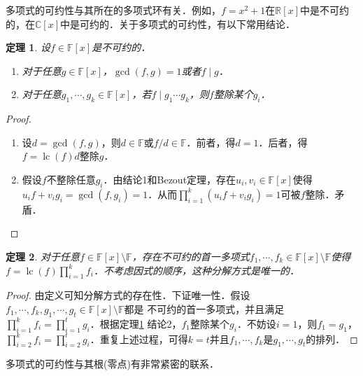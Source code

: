 \documentclass[a4paper,fontset=windows]{ctexbook}
\newtheorem{theorem}{定理}[chapter]
\theoremstyle{definition}
\DeclareMathOperator{\lc}{lc}
\begin{document}
多项式的可约性与其所在的多项式环有关．例如，$f=x^2+1$在$\mathbb{R}[x]$中是不可约的，在$\mathbb{C}[x]$中是可约的．关于多项式的可约性，有以下常用结论．

\begin{theorem}\label{thm11.10}
设$f\in\mathbb{F}[x]$是不可约的．
\begin{enumerate}
\item 对于任意$g\in\mathbb{F}[x]$，$\gcd(f,g)=1$或者$f\mid g$．

\item 对于任意$g_1,\cdots,g_k\in\mathbb{F}[x]$，若$f\mid g_1\cdots g_k$，则$f$整除某个$g_i$．
\end{enumerate}
\end{theorem}

\begin{proof}~
\begin{enumerate}
\item 设$d=\gcd(f,g)$，则$d\in\mathbb{F}$或$f/d\in\mathbb{F}$．前者，得$d=1$．后者，得$f=\lc(f)d$整除$g$．

\item 假设$f$不整除任意$g_i$．由结论1和Bezout定理，存在$u_i,v_i\in\mathbb{F}[x]$使得$u_if+v_ig_i=\gcd(f,g_i)=1$．从而$\prod\limits_{i=1}^k(u_if+v_ig_i)=1$可被$f$整除．矛盾．\qedhere
\end{enumerate}
\end{proof}

\begin{theorem}
对于任意$f\in\mathbb{F}[x]\setminus\mathbb{F}$，存在不可约的首一多项式$f_1,\cdots,f_k\in\mathbb{F}[x]\setminus\mathbb{F}$使得$f=\lc(f)\prod\limits_{i=1}^kf_i$．不考虑因式的顺序，这种分解方式是唯一的．
\end{theorem}

\begin{proof}
由定义可知分解方式的存在性．下证唯一性．假设$f_1,\cdots,f_k,g_1,\cdots,g_t\in\mathbb{F}[x]\setminus\mathbb{F}$都是
不可约的首一多项式，并且满足$\prod\limits_{i=1}^kf_i=\prod\limits_{i=1}^tg_i$．根据定理\ref{thm11.10} 结论2，$f_1$整除某个$g_i$．不妨设$i=1$，则$f_1=g_1$，$\prod\limits_{i=2}^kf_i=\prod\limits_{i=2}^tg_i$．重复上述过程，可得$k=t$并且$f_1,\cdots,f_k$是$g_1,\cdots,g_t$的排列．
\end{proof}

多项式的可约性与其根(零点)有非常紧密的联系．
\end{document}
